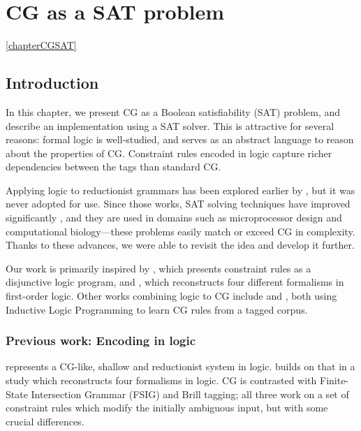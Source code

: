 \chapter{CG as a SAT problem}
\ref{chapterCGSAT}

\section{Introduction}

In this chapter, we present CG %
as a Boolean satisfiability (SAT) problem, and describe an implementation
using a SAT solver. This is attractive for several reasons: formal logic is
well-studied, and serves as an abstract language to reason about the
properties of CG. Constraint rules encoded in logic capture richer
dependencies between the tags than standard CG.

Applying logic to reductionist grammars has been explored earlier by \cite{lager98,lager_nivre01}, but it was never adopted for use.
Since those works, SAT solving techniques have improved significantly \cite{marques_silva2010}, and they are used in domains such as microprocessor design and computational 
biology---these problems easily match or exceed CG in complexity. 
Thanks to these advances, we were able to revisit the idea and develop it
further. 

Our work is primarily inspired by \cite{lager98}, which presents constraint
rules as a disjunctive logic program, and \cite{lager_nivre01}, which
reconstructs four different formalisms in first-order logic.
Other works combining logic to CG include
\cite{lindberg_eineborg98ilp} and \cite{asfrent14}, both using Inductive Logic Programming to learn CG rules from a tagged corpus.

\subsection{Previous work: Encoding in logic}\label{encoding-in-logic}

\cite{lager98} represents a CG-like, shallow and reductionist system in
logic. \cite{lager_nivre01} builds on that in a study which reconstructs
four formalisms in logic. CG is contrasted with Finite-State
Intersection Grammar (FSIG) and Brill tagging; all three work on a set
of constraint rules which modify the initially ambiguous input, but with some crucial
differences.

